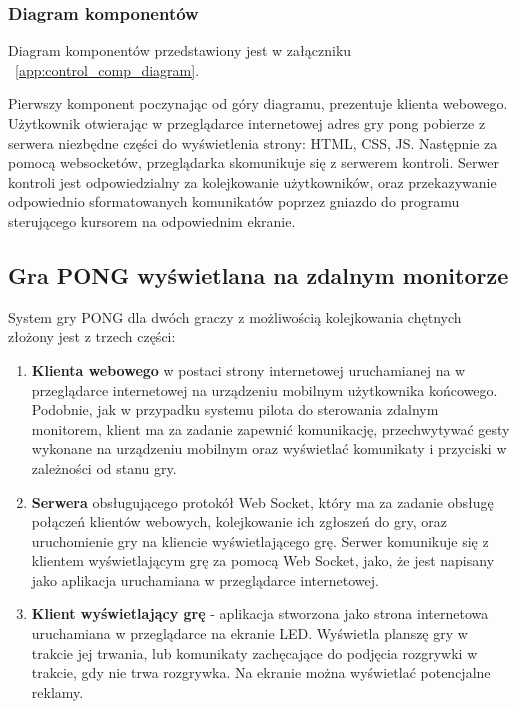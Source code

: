 \subsubsection{Diagram komponentów}

Diagram komponentów przedstawiony jest w załączniku ~\ref{app:control_comp_diagram}.

\par

Pierwszy komponent poczynając od góry diagramu, prezentuje klienta webowego. Użytkownik otwierając w przeglądarce internetowej adres gry pong pobierze z serwera niezbędne części do wyświetlenia strony: HTML, CSS, JS. Następnie za pomocą websocketów, przeglądarka skomunikuje się z serwerem kontroli. Serwer kontroli jest odpowiedzialny za kolejkowanie użytkowników, oraz przekazywanie odpowiednio sformatowanych komunikatów poprzez gniazdo do programu sterującego kursorem na odpowiednim ekranie.

\subsection{Gra PONG wyświetlana na zdalnym monitorze}

System gry PONG dla dwóch graczy z możliwością kolejkowania chętnych złożony jest z trzech części:

\begin{enumerate}
  \item \textbf{Klienta webowego} w postaci strony internetowej uruchamianej na w przeglądarce internetowej na urządzeniu mobilnym użytkownika końcowego. Podobnie, jak w przypadku systemu pilota do sterowania zdalnym monitorem, klient ma za zadanie zapewnić komunikację, przechwytywać gesty wykonane na urządzeniu mobilnym oraz wyświetlać komunikaty i przyciski w zależności od stanu gry.
  \item \textbf{Serwera} obsługującego protokół Web Socket, który ma za zadanie obsługę połączeń klientów webowych, kolejkowanie ich zgłoszeń do gry, oraz uruchomienie gry na kliencie wyświetlającego grę. Serwer komunikuje się z klientem wyświetlającym grę za pomocą Web Socket, jako, że jest napisany jako aplikacja uruchamiana w przeglądarce internetowej.
  \item \textbf{Klient wyświetlający grę} - aplikacja stworzona jako strona internetowa uruchamiana w przeglądarce na ekranie LED. Wyświetla planszę gry w trakcie jej trwania, lub komunikaty zachęcające do podjęcia rozgrywki w trakcie, gdy nie trwa rozgrywka. Na ekranie można wyświetlać potencjalne reklamy.
\end{enumerate}

